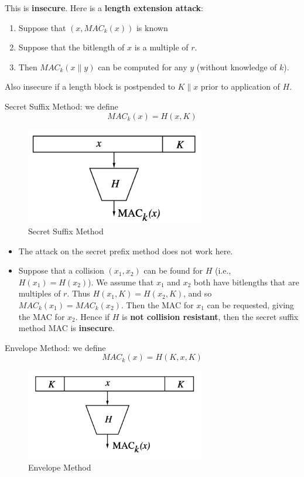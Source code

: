 \documentclass[12pt,titlepage]{article}
\begin{document}
This is \textbf{insecure}. Here is a \textbf{length extension attack}: \begin{enumerate}
\item Suppose that $(x, MAC_k (x))$ is known
\item Suppose that the bitlength of $x$ is a multiple of $r$.
\item Then $MAC_k (x \| y)$ can be computed for any $y$ (without knowledge of $k$).
\end{enumerate}
Also insecure if a length block is postpended to $K \| x$ prior to application of $H$.

Secret Suffix Method: we define $$MAC_k (x) = H(x, K)$$

\begin{center}
	\begin{figure}[h!]
		\centering
		\includegraphics[width=0.7\textwidth]{Secret_Suffix_Method.png}
		\caption{Secret Suffix Method}
	\end{figure}
\end{center}

\begin{itemize}
	\item The attack on the secret prefix method does not work here.
	\item Suppose that a collision $(x_1 , x_2)$ can be found for $H$ (i.e., $H(x_1) = H(x_2)$). We assume that $x_1$ and $x_2$ both have bitlengths that are multiples of $r$. Thus $H(x_1, K) = H(x_2 , K)$, and so $MAC_k (x_1) = MAC_k (x_2)$. Then the MAC for $x_1$ can be requested, giving the MAC for $x_2$. Hence if $H$ is \textbf{not collision resistant}, then the secret suffix method MAC is \textbf{insecure}.
\end{itemize}

Envelope Method: we define $$MAC_k (x) = H(K, x, K)$$

\begin{center}
	\begin{figure}[h!]
		\centering
		\includegraphics[width=0.7\textwidth]{Envelope_Method.png}
		\caption{Envelope Method}
	\end{figure}
\end{center}
\end{document}
